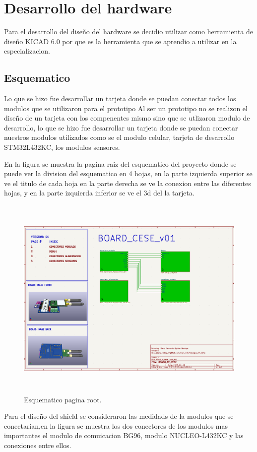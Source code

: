 \clearpage
\section{Desarrollo del hardware}

Para el desarrollo del diseño del hardware se decidio utilizar como herramienta de diseño KICAD 6.0 por que es la herramienta que se aprendio a utilizar en la especializacion.

\subsection{Esquematico} 
Lo que se hizo fue desarrollar un tarjeta donde se puedan conectar todos los modulos que se utilizaron para el prototipo
Al ser un prototipo no se realizon el diseño de un tarjeta con los compenentes mismo sino que se utlizaron modulo de desarrollo, lo que se hizo fue desarrollar un tarjeta donde se puedan conectar nuestros modulos utilizados como se el modulo celular, tarjeta de desarrollo STM32L432KC, los modulos sensores.

En la figura se muestra la pagina raiz del esquematico del proyecto donde se puede ver la division del esquematico en 4 hojas, en la parte izquierda superior se ve el titulo de cada hoja en la parte derecha se ve la conexion entre las diferentes hojas, y en la parte izquierda inferior se ve el 3d del la tarjeta. 

\begin{figure}[h]
  \centering
	\includegraphics[width=\textwidth, height=10cm]{./Figures/esquematico_root.png}
	\caption{Esquematico pagina root.}
	\label{fig:esquematico root}
\end{figure}
\clearpage
Para el diseño del shield se consideraron las medidads de la modulos que se conectarian,en la figura se muestra los dos conectores de los modulos mas importantes el modulo de comuicacion BG96, modulo NUCLEO-L432KC y las conexiones entre ellos.

